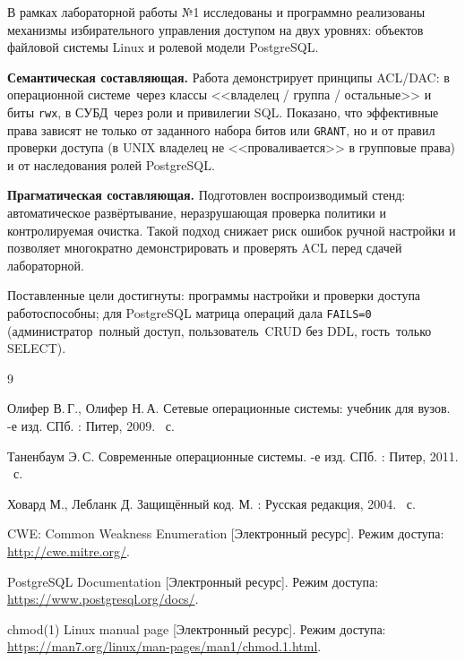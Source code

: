 
В рамках лабораторной работы №1 исследованы и программно реализованы механизмы избирательного управления доступом на двух уровнях: объектов файловой системы Linux и ролевой модели PostgreSQL.

\textbf{Семантическая составляющая.} Работа демонстрирует принципы ACL/DAC: в операционной системе~\mdash  через классы <<владелец / группа / остальные>> и биты \texttt{rwx}, в СУБД~\mdash  через роли и привилегии SQL. Показано, что эффективные права зависят не только от заданного набора битов или \texttt{GRANT}, но и от правил проверки доступа (в UNIX владелец не <<проваливается>> в групповые права) и от наследования ролей PostgreSQL.

\textbf{Прагматическая составляющая.} Подготовлен воспроизводимый стенд: автоматическое развёртывание, неразрушающая проверка политики и контролируемая очистка. Такой подход снижает риск ошибок ручной настройки и позволяет многократно демонстрировать и проверять ACL перед сдачей лабораторной.

Поставленные цели достигнуты: программы настройки и проверки доступа работоспособны; для PostgreSQL матрица операций дала \texttt{FAILS=0} (администратор~\mdash  полный доступ, пользователь~\mdash  CRUD без DDL, гость~\mdash  только SELECT).

\begin{thebibliography}{9}

	Олифер В.\,Г., Олифер Н.\,А. Сетевые операционные системы: учебник для вузов. -е изд. \mdash  СПб. : Питер, 2009. ~с.

	Таненбаум Э.\,С. Современные операционные системы. -е изд. \mdash  СПб. : Питер, 2011. ~с.

	Ховард М., Лебланк Д. Защищённый код. \mdash  М. : Русская редакция, 2004. ~с.

	CWE: Common Weakness Enumeration [Электронный ресурс]. \mdash  Режим доступа: \url{http://cwe.mitre.org/}.

	PostgreSQL Documentation [Электронный ресурс]. \mdash  Режим доступа: \url{https://www.postgresql.org/docs/}.

	chmod(1) \mdash  Linux manual page [Электронный ресурс]. \mdash  Режим доступа: \url{https://man7.org/linux/man-pages/man1/chmod.1.html}.
\end{thebibliography}
